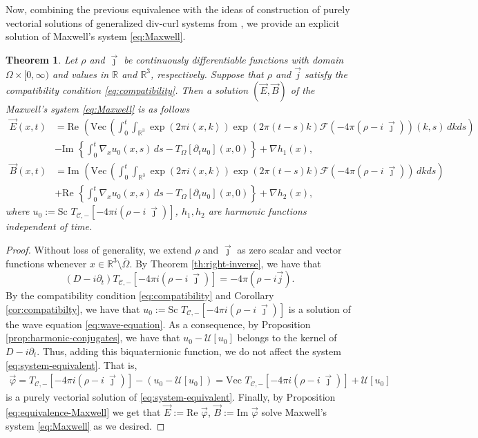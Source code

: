 \documentclass[12pt]{article}
\newtheorem{theorem}{Theorem}
\def\R{\mathbb{R}}
\def\Vec{\mbox{Vec}\,}
\def\R{\mathbb{R}}
\def\Vec{\mbox{Vec}\,}
\newcommand{\inner}[1]{\left\langle #1 \right\rangle}
\newcommand{\fourier}[1]{\mathcal{F}\left( #1 \right)}
\newcommand{\expo}[1]{\exp\left( #1\right)}
\newcommand{\Twm}[1]{T_{\mathscr{C},-}\left[ #1\right]}
\begin{document}
Now, combining the previous equivalence with the ideas of construction of purely vectorial solutions of generalized div-curl systems from \cite{DelPor2017, DelPor2018, DelKrav2019, DelMac2021, delgado2023biquaternionic}, we provide an explicit solution of Maxwell's system \eqref{eq:Maxwell}.
\begin{theorem}\label{solutions:for:maxwell:equations}
    Let $\rho$ and $\vec\jmath$ be continuously differentiable functions with domain $\Omega\times[0,\infty)$ and values in $\R$ and $\R^3$, respectively. Suppose that $\rho$ and $\vec j$ satisfy the compatibility condition \eqref{eq:compatibility}. Then a solution $(\vec E, \vec B)$ of the Maxwell's system \eqref{eq:Maxwell} is as follows
        \begin{align*}
        \vec E(x,t)&=\text{Re }\left(\Vec\left(\int_0^t\int_{\R^3}\expo{2\pi i\inner{x,k}}\expo{2\pi(t-s)k}\fourier{-4\pi(\rho-i\:\vec\jmath)}(k,s)\, dkds\right)\right.\\
        &-\text{Im }\left\{\int_0^t \nabla_{x} u_0(x,s)\, ds-T_\Omega[\partial_t u_0](x,0) \right\}+\nabla h_1(x),
    \end{align*}
    \begin{align*}
        \vec B(x,t)&=\text{Im }\left(\Vec\left(\int_0^t\int_{\R^3}\expo{2\pi i\inner{x,k}}\expo{2\pi(t-s)k}\fourier{-4\pi(\rho-i\:\vec\jmath)}\,dkds\right)\right.\\
        &+\text{Re }\left\{\int_0^t \nabla _x u_0(x,s)\, ds-T_\Omega[\partial_t u_0](x,0)\right\}+\nabla h_2(x),
    \end{align*}
where $u_0:=\text{Sc }\Twm{-4\pi i(\rho-i\:\vec\jmath)}$, $h_1, h_2$ are harmonic functions independent of time.
\end{theorem}

\begin{proof}
Without loss of generality, we extend $\rho$ and $\vec\jmath$ as zero scalar and vector functions whenever $x\in \R^3\setminus \overline{\Omega}$. By Theorem \ref{th:right-inverse}, we have that
\begin{equation*}
    (D-i\partial_t)\Twm{-4\pi i(\rho-i\:\vec\jmath)}=-4\pi(\rho-i\vec j). 
\end{equation*}
By the compatibility condition \eqref{eq:compatibility} and Corollary \ref{cor:compatibilty}, we have that $u_0:=\text{Sc }\Twm{-4\pi i(\rho-i\:\vec\jmath)}$ is a solution of the wave equation \eqref{eq:wave-equation}. As a consequence, by Proposition \ref{prop:harmonic-conjugates}, we have that $u_0-\mathscr{U}[u_0]$ belongs to the kernel of $D-i\partial_t$. Thus, adding this biquaternionic function, we do not affect the system \eqref{eq:system-equivalent}. That is, \begin{align*}
\vec \varphi=\Twm{-4\pi i(\rho-i\:\vec\jmath)} -(u_0-\mathscr{U}[u_0])=\text{Vec } \Twm{-4\pi i(\rho-i\:\vec\jmath)}+\mathscr{U}[u_0]
\end{align*}
is a purely vectorial solution of \eqref{eq:system-equivalent}. Finally, by Proposition \ref{eq:equivalence-Maxwell} we get that $\vec E:=\text{Re }\vec \varphi$, $\vec B:=\text{Im }\vec \varphi$ solve Maxwell's system \eqref{eq:Maxwell} as we desired.
\end{proof}
\end{document}
